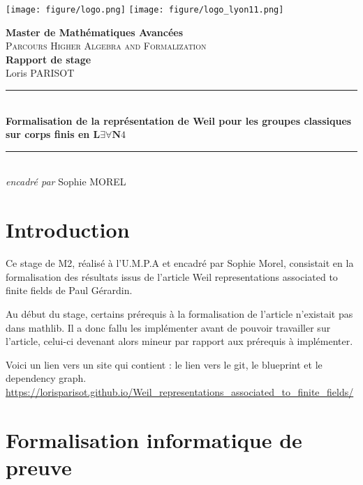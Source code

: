 \documentclass[10pt]{article}
\theoremstyle{definition}
\begin{document}
	\thispagestyle{empty} 
	
	\texttt{[image: figure/logo.png]} 
	\hfill
	\texttt{[image: figure/logo\_lyon11.png]}\par\vspace{1cm}
	\begin{center}
	\Large \textbf{Master de Mathématiques Avancées}\normalsize \\
	\textsc{Parcours Higher Algebra and Formalization}\\ \vspace{8\baselineskip}
	\Huge \textbf{Rapport de stage} \normalsize \\ \vspace{0.9\baselineskip}
	\Large Loris PARISOT \normalsize\\ \vspace{2\baselineskip}
	\rule{0.95\textwidth}{2pt}\vspace{0.9\baselineskip}\\
	\LARGE \textbf{Formalisation de la représentation de Weil pour les groupes classiques sur corps finis en $\mathbf{L\exists\forall N}4$}\vspace{0.5\baselineskip}\normalsize\\
	\rule{0.95\textwidth}{2pt}\\
	\Large \textit{encadré par} Sophie MOREL
	\end{center}
	\vspace{10cm}
	\newpage
	\section*{Introduction}
	Ce stage de M2, réalisé à l'U.M.P.A et encadré par Sophie Morel, consistait en la formalisation des résultats issus de l'article \og Weil representations associated to finite fields \fg de Paul Gérardin. 
	\newline
	
	Au début du stage, certains prérequis à la formalisation de l'article n'existait pas dans mathlib. Il a donc fallu les implémenter avant de pouvoir travailler sur l'article, celui-ci devenant alors mineur par rapport aux prérequis à implémenter.
	\newline
	
	Voici un lien vers un site qui contient : le lien vers le git, le blueprint et le dependency graph.
	\url{https://lorisparisot.github.io/Weil_representations_associated_to_finite_fields/}
\newpage

\section{Formalisation informatique de preuve}
\end{document}
